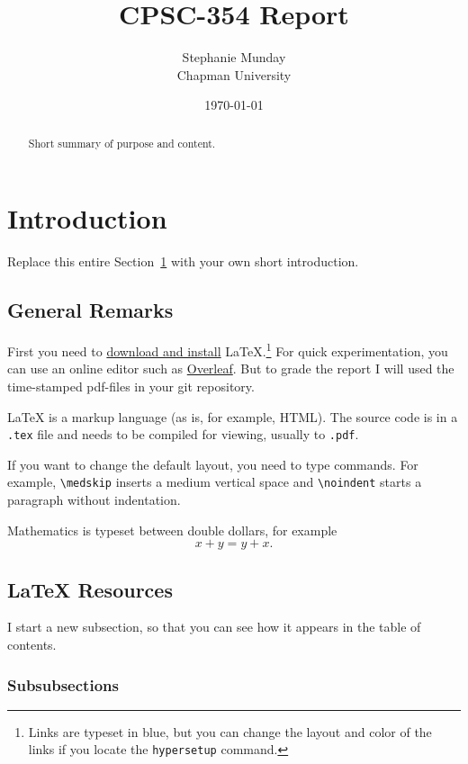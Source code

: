 \documentclass{article}
\title{CPSC-354 Report}
\author{Stephanie Munday  \\ Chapman University}
\date{\today}
\theoremstyle{theorem}
\theoremstyle{definition}
\theoremstyle{remark}
\begin{document}
\maketitle

\begin{abstract}
Short  summary of purpose and content.  
\end{abstract}

\tableofcontents

\section{Introduction}\label{intro}

Replace this entire Section~\ref{intro} with your own short introduction. 

\subsection{General Remarks}

First you need to \href{https://www.latex-project.org/get/}{download and install} LaTeX.\footnote{Links are typeset in blue, but you can change the layout and color of the links if you locate the  \texttt{hypersetup} command.}
%
For quick experimentation, you can use an online editor such as \href{https://www.overleaf.com/learn}{Overleaf}. But to grade the report I will used the time-stamped pdf-files in your git repository.  

 
\medskip\noindent
LaTeX is a markup language (as is, for example, HTML). The source code is in a \verb+.tex+ file and needs to be compiled for viewing, usually to \verb+.pdf+.


\medskip\noindent
If you want to change the default layout, you need to type commands. For example, \verb+\medskip+ inserts a medium vertical space and \verb+\noindent+ starts a paragraph without indentation.
 
\medskip\noindent
Mathematics is typeset between double dollars, for example $$x+y=y+x.$$


\subsection{LaTeX Resources}

I start a new subsection, so that you can see how it appears in the table of contents.

\subsubsection{Subsubsections}
\end{document}
